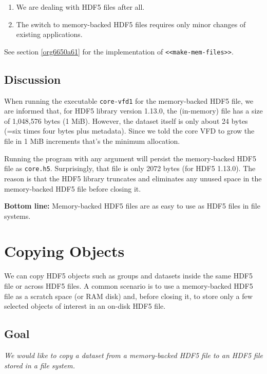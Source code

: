 \documentclass[a4paper, 12pt]{article}
\begin{document}
\begin{enumerate}
\item We are dealing with HDF5 files after all.
\item The switch to memory-backed HDF5 files requires only minor changes of
existing applications.
\end{enumerate}

See section \ref{org6650a61} for the implementation of
\texttt{<<make-mem-files>>}.

\subsection{Discussion}
\label{sec:org972d7e2}

When running the executable \texttt{core-vfd1} for the memory-backed HDF5 file, we
are informed that, for HDF5 library version 1.13.0, the (in-memory) file has
a size of 1,048,576 bytes (1 MiB). However, the dataset itself is only about
24 bytes (=six times four bytes plus metadata). Since we told the core VFD
to grow the file in 1 MiB increments that's the minimum allocation.

Running the program with any argument will persist the memory-backed HDF5
file as \texttt{core.h5}. Surprisingly, that file is only 2072 bytes (for HDF5
1.13.0). The reason is that the HDF5 library truncates and eliminates any
unused space in the memory-backed HDF5 file before closing it.

\textbf{\textbf{Bottom line:}} Memory-backed HDF5 files are as easy to use as HDF5 files
in file systems.

\section{Copying Objects \label{orga6e6d24}}
\label{sec:org3e7daa7}

We can copy HDF5 objects such as groups and datasets inside the same HDF5
file or across HDF5 files. A common scenario is to use a memory-backed HDF5
file as a scratch space (or RAM disk) and, before closing it, to store only a
few selected objects of interest in an on-disk HDF5 file.

\subsection{Goal}
\label{sec:orgd57ac4f}

\emph{We would like to copy a dataset from a memory-backed HDF5 file to an HDF5
file stored in a file system.}
\end{document}
